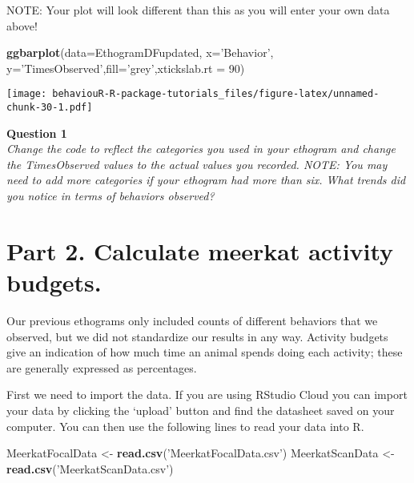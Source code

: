 \documentclass[]{book}
\newenvironment{Shaded}{\begin{snugshade}}{\end{snugshade}}
\newcommand{\DataTypeTok}[1]{\textcolor[rgb]{0.13,0.29,0.53}{#1}}
\newcommand{\DecValTok}[1]{\textcolor[rgb]{0.00,0.00,0.81}{#1}}
\newcommand{\KeywordTok}[1]{\textcolor[rgb]{0.13,0.29,0.53}{\textbf{#1}}}
\newcommand{\NormalTok}[1]{#1}
\newcommand{\StringTok}[1]{\textcolor[rgb]{0.31,0.60,0.02}{#1}}
\begin{document}
NOTE: Your plot will look different than this as you will enter your own data above!

\begin{Shaded}
\begin{Highlighting}[]
\KeywordTok{ggbarplot}\NormalTok{(}\DataTypeTok{data=}\NormalTok{EthogramDFupdated, }\DataTypeTok{x=}\StringTok{'Behavior'}\NormalTok{, }\DataTypeTok{y=}\StringTok{'TimesObserved'}\NormalTok{,}\DataTypeTok{fill=}\StringTok{'grey'}\NormalTok{,}\DataTypeTok{xtickslab.rt =} \DecValTok{90}\NormalTok{)}
\end{Highlighting}
\end{Shaded}

\texttt{[image: behaviouR-R-package-tutorials\_files/figure-latex/unnamed-chunk-30-1.pdf]}

\textbf{Question 1}\\
\emph{Change the code to reflect the categories you used in your ethogram and change the TimesObserved values to the actual values you recorded. NOTE: You may need to add more categories if your ethogram had more than six. What trends did you notice in terms of behaviors observed?}

\hypertarget{part-2.-calculate-meerkat-activity-budgets.}{%
\section*{Part 2. Calculate meerkat activity budgets.}\label{part-2.-calculate-meerkat-activity-budgets.}}

Our previous ethograms only included counts of different behaviors that we observed, but we did not standardize our results in any way. Activity budgets give an indication of how much time an animal spends doing each activity; these are generally expressed as percentages.

First we need to import the data. If you are using RStudio Cloud you can import your data by clicking the `upload' button and find the datasheet saved on your computer. You can then use the following lines to read your data into R.

\begin{Shaded}
\begin{Highlighting}[]
\NormalTok{MeerkatFocalData <-}\StringTok{ }\KeywordTok{read.csv}\NormalTok{(}\StringTok{'MeerkatFocalData.csv'}\NormalTok{)}
\NormalTok{MeerkatScanData <-}\StringTok{ }\KeywordTok{read.csv}\NormalTok{(}\StringTok{'MeerkatScanData.csv'}\NormalTok{)}
\end{Highlighting}
\end{Shaded}
\end{document}
